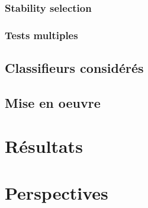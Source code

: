 \documentclass[11pt]{article}
\begin{document}
\hypertarget{stability-selection}{%
\subsubsection{Stability selection}\label{stability-selection}}

\hypertarget{tests-multiples}{%
\subsubsection{Tests multiples}\label{tests-multiples}}

\hypertarget{classifieurs-consideres}{%
\subsection{Classifieurs considérés}\label{classifieurs-consideres}}

\hypertarget{mise-oeuvre}{%
\subsection{Mise en oeuvre}\label{mise-oeuvre}}

\hypertarget{resultats}{%
\section{Résultats}\label{resultats}}

\hypertarget{perspectives}{%
\section{Perspectives}\label{perspectives}}
\end{document}
